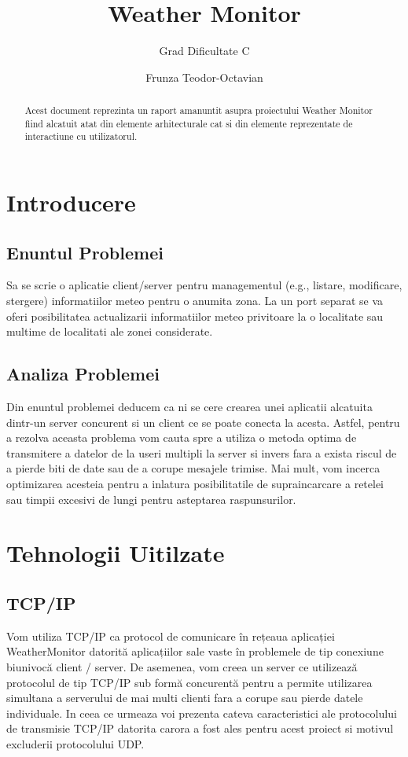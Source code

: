\documentclass{llncs}
\begin{document}
%
\title{Weather Monitor}
%
\subtitle{Grad Dificultate C}
%
\author{Frunza Teodor-Octavian}
%
%
\maketitle
%
\begin{abstract}
Acest document reprezinta un raport amanuntit asupra proiectului Weather Monitor fiind alcatuit atat din elemente arhitecturale cat si din elemente reprezentate de interactiune cu utilizatorul.
\end{abstract}
%
\section{Introducere}
%
\subsection{Enuntul Problemei}
Sa se scrie o aplicatie client/server pentru managementul (e.g., listare, modificare, stergere) informatiilor meteo pentru o anumita zona. La un port separat se va oferi posibilitatea actualizarii informatiilor meteo privitoare la o localitate sau multime de localitati ale zonei considerate.
%
\subsection{Analiza Problemei}
Din enuntul problemei deducem ca ni se cere crearea unei aplicatii alcatuita dintr-un server concurent si un client ce se poate conecta la acesta.
Astfel, pentru a rezolva aceasta problema vom cauta spre a utiliza o metoda optima de transmitere a datelor de la useri multipli la server si invers fara a exista riscul de a pierde biti de date sau
de a corupe mesajele trimise. Mai mult, vom incerca optimizarea acesteia pentru a inlatura posibilitatile de supraincarcare a retelei sau timpii excesivi de lungi pentru asteptarea raspunsurilor.
%
\section{Tehnologii Uitilzate}
%
\subsection{TCP/IP}
Vom utiliza TCP/IP ca protocol de comunicare în rețeaua aplicației WeatherMonitor datorită aplicațiilor sale vaste în problemele de tip conexiune biunivocă client / server. De asemenea, vom creea un server ce utilizează protocolul de tip TCP/IP sub formă concurentă pentru a permite utilizarea simultana a serverului de mai multi clienti fara a corupe sau pierde datele individuale. In ceea ce urmeaza voi prezenta cateva caracteristici ale protocolului de transmisie TCP/IP datorita carora a fost ales pentru acest proiect si motivul excluderii protocolului UDP.
%
\end{document}
